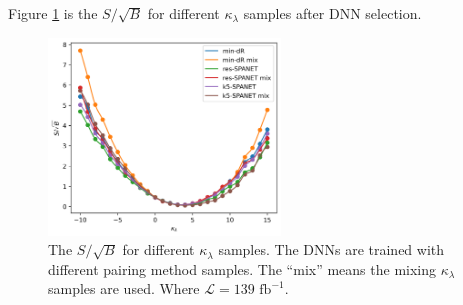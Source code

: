 \documentclass[12pt]{article}
\begin{document}
		Figure \ref{fig:SB_kappa} is the $S / \sqrt{B}$ for different $\kappa_\lambda$ samples after DNN selection.
		\begin{figure}[htpb]
			\centering
			\includegraphics[width=0.55\textwidth]{SB_different_kappa.png}
			\caption{The $S / \sqrt{B}$ for different $\kappa_\lambda$ samples. The DNNs are trained with different pairing method samples. The ``mix'' means the mixing  $\kappa_\lambda$ samples are used. Where $\mathcal{L} = 139 \text{ fb}^{-1}$.}
			\label{fig:SB_kappa}
		\end{figure}

\end{document}
